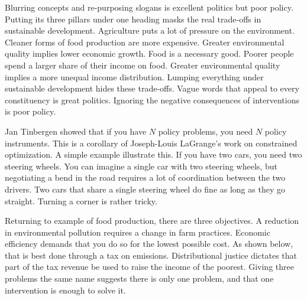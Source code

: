 Blurring concepts and re-purposing slogans is excellent politics but poor policy. Putting its three pillars under one heading masks the real trade-offs in sustainable development. Agriculture puts a lot of pressure on the environment. Cleaner forms of food production are more expensive. Greater environmental quality implies lower economic growth. Food is a necessary good. Poorer people spend a larger share of their income on food. Greater environmental quality implies a more unequal income distribution. Lumping everything under sustainable development hides these trade-offs. Vague words that appeal to every constituency is great politics. Ignoring the negative consequences of interventions is poor policy.

Jan Tinbergen showed that if you have $N$ policy problems, you need $N$ policy instruments. This is a corollary of Joseph-Louis LaGrange's work on constrained optimization. A simple example illustrate this. If you have two cars, you need two steering wheels. You can imagine a single car with two steering wheels, but negotiating a bend in the road requires a lot of coordination between the two drivers. Two cars that share a single steering wheel do fine as long as they go straight. Turning a corner is rather tricky.

Returning to example of food production, there are three objectives. A reduction in environmental pollution requires a change in farm practices. Economic efficiency demands that you do so for the lowest possible cost. As shown below, that is best done through a tax on emissions. Distributional justice dictates that part of the tax revenue be used to raise the income of the poorest. Giving three problems the same name suggests there is only one problem, and that one intervention is enough to solve it.